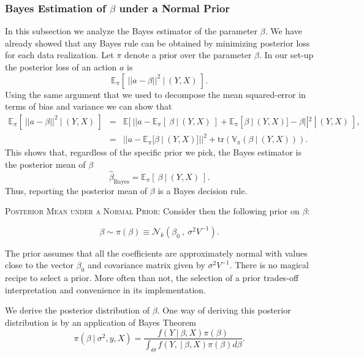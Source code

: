 \documentclass[11pt]{article} %
\begin{document}
\subsubsection{Bayes Estimation of $\beta$ under a Normal Prior}
In this subsection we analyze the Bayes estimator of the parameter $\beta$. We have already showed that any Bayes rule can be obtained by minimizing posterior loss for each data realization. Let $\pi$ denote a prior over the parameter $\beta$. In our set-up the posterior loss of an action $a$ is
\[ \mathbb{E}_{\pi} [ \: || a - \beta ||^2 \: | \: (Y,X) \: ]. \]
Using the same argument that we used to decompose the mean squared-error in terms of bias and variance we can show that
\begin{eqnarray*}
\mathbb{E}_{\pi} [ \: || a - \beta ||^2 \: | \: (Y,X) \: ] &=& \mathbb{E}[ \: || a - \mathbb{E}_{\pi} [ \: \beta \: | \:  (Y,X) \:  ] + \mathbb{E}_{\pi} [ \beta \: | \: (Y,X) ] -  \beta ||^2 \: | \: (Y,X) \: ],  \\
&=& || a - \mathbb{E}_{\pi} [ \beta \: | \: (Y,X) ] ||^2  + \textrm{tr} \left( \mathbb{V}_{\pi} ( \beta \: | \: (Y,X) ) \right). 
\end{eqnarray*}
This shows that, regardless of the specific prior we pick, the Bayes estimator is the posterior mean of $\beta$
\[ \widehat{\beta}_{\textrm{Bayes}} =   \mathbb{E}_{\pi} [ \: \beta \: | \: (Y,X) \: ].  \]
Thus, reporting the posterior mean of $\beta$ is a Bayes decision rule. 

{\scshape Posterior Mean under a Normal Prior:}  Consider then the following prior on $\beta$:

\begin{equation} \label{equation:prior}
\beta  \sim \pi (\beta) \equiv \mathcal{N}_{k}( \beta_0 \: , \: \sigma^2 V^{-1}).
\end{equation}

\noindent The prior assumes that all the coefficients are approximately normal with values close to the vector $\beta_0$ and covariance matrix given by $\sigma^2 V^{-1}$. There is no magical recipe to select a prior. More often than not, the selection of a prior trades-off interpretation and convenience in its implementation. 

We derive the posterior distribution of $\beta$. One way of deriving this posterior distribution is by an application of Bayes Theorem
\begin{equation*}
\pi(\beta \: | \: \sigma^2, y, X ) = \frac{f(Y  \: | \: \beta, X) \pi(\beta ) }{\int_{\Theta} f(Y, \: | \: \beta, X) \pi (\beta ) d \beta}. 
\end{equation*}
\end{document}
